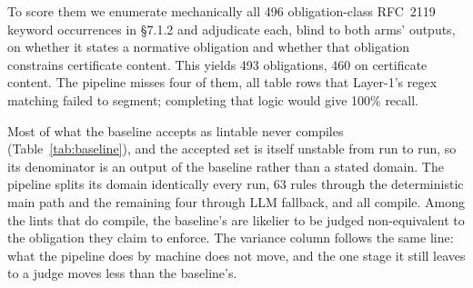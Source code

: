 To score them we enumerate mechanically all 496 obligation-class RFC~2119 keyword
occurrences in \S7.1.2 and adjudicate each, blind to both arms' outputs, on
whether it states a normative obligation and whether that obligation constrains
certificate content. This yields 493 obligations, 460 on certificate content. The
pipeline misses four of them, all table rows that Layer-1's regex matching failed
to segment; completing that logic would give 100\% recall.

Most of what the baseline accepts as lintable never compiles
(Table~\ref{tab:baseline}), and the accepted set is itself unstable from run to
run, so its denominator is an output of the baseline rather than a stated domain.
The pipeline splits its domain identically every run, 63 rules through the
deterministic main path and the remaining four through LLM fallback, and all
compile. Among the lints that do compile, the baseline's are likelier to be
judged non-equivalent to the obligation they claim to enforce. The variance
column follows the same line: what the pipeline does by machine does not move,
and the one stage it still leaves to a judge moves less than the baseline's.

